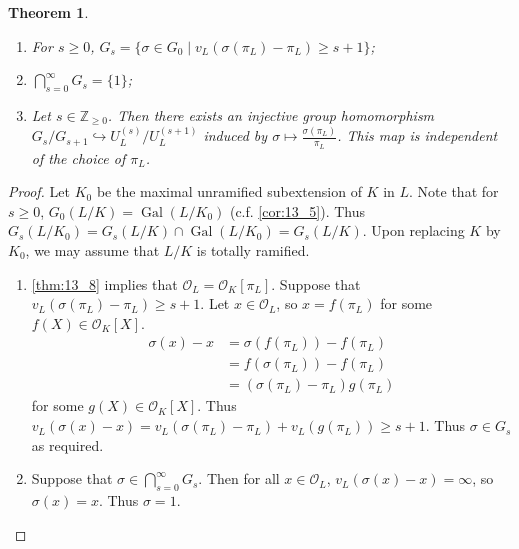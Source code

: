 \documentclass[11pt]{article}
\theoremstyle{definition}
\theoremstyle{plain}
\newtheorem{theorem}[definition]{Theorem}
\theoremstyle{remark}
\DeclareMathOperator{\Gal}{Gal}
\newcommand{\ZZ}{\mathbb{Z}}
\newcommand{\cO}{\mathcal{O}}
\begin{document}
\begin{theorem}\label{thm:14_2}\phantom{}
    \begin{enumerate}
        \item For $s \ge 0$, $G_s = \{\sigma \in G_0 \mid v_L(\sigma(\pi_L) - \pi_L) \ge s+1\}$;
        \item $\bigcap_{s=0}^\infty G_s = \{1\}$;
        \item Let $s \in \ZZ_{\ge 0}$. Then there exists an injective group homomorphism $G_s / G_{s+1} \hookrightarrow U_L^{(s)} / U_L^{(s+1)}$ induced by $\sigma \mapsto \frac{\sigma(\pi_L)}{\pi_L}$. This map is independent of the choice of $\pi_L$.
    \end{enumerate}
\end{theorem}
\begin{proof}
    Let $K_0$ be the maximal unramified subextension of $K$ in $L$. Note that for $s \ge 0$, $G_0(L/K) = \Gal(L/K_0)$ (c.f. \autoref{cor:13_5}). Thus $G_s(L/K_0) = G_s(L/K) \cap \Gal(L/K_0) = G_s(L/K)$. Upon replacing $K$ by $K_0$, we may assume that $L / K$ is totally ramified.

    \begin{enumerate}
        \item \autoref{thm:13_8} implies that $\cO_L = \cO_K[\pi_L]$. Suppose that $v_L(\sigma(\pi_L) - \pi_L) \ge s+1$. Let $x \in \cO_L$, so $x = f(\pi_L)$ for some $f(X) \in \cO_K[X]$.
            \begin{align*}
                \sigma(x) - x
                &= \sigma(f(\pi_L)) - f(\pi_L)\\
                &= f(\sigma(\pi_L)) - f(\pi_L)\\
                &= (\sigma(\pi_L) - \pi_L) g(\pi_L)
            \end{align*}
            for some $g(X) \in \cO_K[X]$. Thus $v_L(\sigma(x) - x) = v_L(\sigma(\pi_L) - \pi_L) + v_L(g(\pi_L)) \ge s + 1$. Thus $\sigma \in G_s$ as required.

        \item Suppose that $\sigma \in \bigcap_{s=0}^\infty G_s$. Then for all $x \in \cO_L$, $v_L(\sigma(x) - x) = \infty$, so $\sigma(x) = x$. Thus $\sigma = 1$.


\end{enumerate}
\end{proof}
\end{document}

